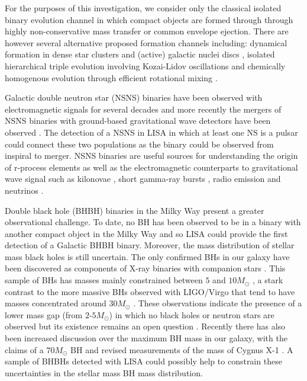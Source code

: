 For the purposes of this investigation, we consider only the classical isolated binary evolution channel \citep[e.g.][]{Tutukov+1973,Tutukov+1993,Kalogera+2007,Belczynski+2016} in which compact objects are formed through through highly non-conservative mass transfer or common envelope ejection. There are however several alternative proposed formation channels including: dynamical formation in dense star clusters \citep[e.g.][]{Sigurdsson+1993,PortegiesZwart+2000,Miller+2009,Rodriguez+2015} and (active) galactic nuclei discs \citep[e.g.][]{Morris+1993, Antonini+2016, McKernan+2020}, isolated hierarchical triple evolution involving Kozai-Lidov oscillations \citep[e.g.][]{Stephan+2016, Silsbee+2017,Antonini+2017} and chemically homogenous evolution through efficient rotational mixing \citep[e.g.][]{deMink+2009, deMink+2016,Marchant+2016,duBuisson+2020}.

Galactic double neutron star (NSNS) binaries have been observed with electromagnetic signals for several decades \citep[e.g.][]{Hulse+1975} and more recently the mergers of NSNS binaries with ground-based gravitational wave detectors have been observed \citep[e.g.][]{Abbott+2017_NSNS}. The detection of a NSNS in LISA in which at least one NS is a pulsar could connect these two populations as the binary could be observed from inspiral to merger. NSNS binaries are useful sources for understanding the origin of r-process elements \citep[e.g.][]{Eichler+1989} as well as the electromagnetic counterparts to gravitational wave signal such as kilonovae \citep[e.g.][]{Metzger+2017}, short gamma-ray bursts \citep[e.g.][]{Gompertz+2020}, radio emission \citep[e.g.][]{Hotokezaka+2016} and neutrinos \citep[e.g.][]{Kyutoku+2018}.

Double black hole (BHBH) binaries in the Milky Way present a greater observational challenge. To date, no BH has been observed to be in a binary with another compact object in the Milky Way and so LISA could provide the first detection of a Galactic BHBH binary. Moreover, the mass distribution of stellar mass black holes is still uncertain. The only confirmed BHs in our galaxy have been discovered as components of X-ray binaries with companion stars \citep[e.g.][]{Bolton+1972,Webster+1972}. This sample of BHs has masses mainly constrained between $5$ and $10 \unit{M_\odot}$ \citep{Corral-Santana+2016}, a stark contrast to the more massive BHs observed with LIGO/Virgo that tend to have masses concentrated around $30 \unit{M_{\odot}}$ \citep{Abbott+2020_GWTC2}. These observations indicate the presence of a lower mass gap (from $2$-$5 \unit{M_{\odot}}$) in which no black holes or neutron stars are observed \citep{Ozel+2010,Farr+2011} but its existence remains an open question \citep[e.g.][]{Woosley+2020}. Recently there has also been increased discussion over the maximum BH mass in our galaxy, with the claims of a $70 \unit{M_{\odot}}$ BH \citep{Liu+2019,Abdul-Masih+2020} and revised measurements of the mass of Cygnus X-1 \citep{Miller-Jones+2021}. A sample of BHBHs detected with LISA could possibly help to constrain these uncertainties in the stellar mass BH mass distribution.

